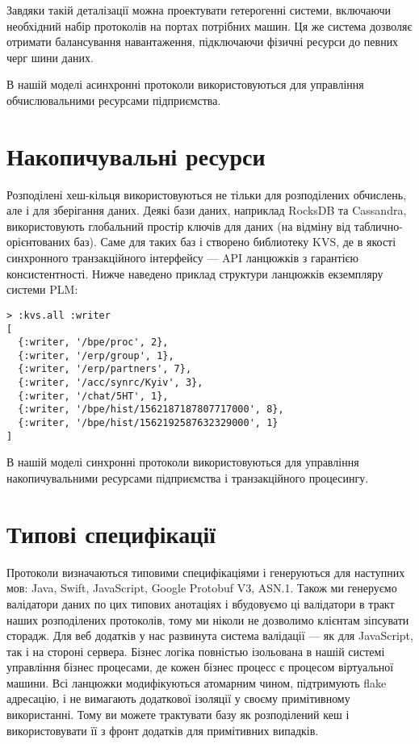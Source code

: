 Завдяки такій деталізації можна проектувати гетерогенні системи,
включаючи необхідний набір протоколів на портах потрібних машин. Ця же система
дозволяє отримати балансування навантаження, підключаючи фізичні ресурси
до певних черг шини даних.

В нашій моделі асинхронні протоколи використовуються для управління
обчислювальними ресурсами підприємства.

\newpage
\section{Накопичувальні ресурси}

Розподілені хеш-кільця використовуються не тільки для розподілених обчислень,
але і для зберігання даних.
Деякі бази даних, наприклад RocksDB та Cassandra, використовують глобальний простір
ключів для даних (на відміну від таблично-орієнтованих баз). Саме для таких
баз і створено библиотеку KVS, де в якості синхронного транзакційного
інтерфейсу — API ланцюжків з гарантією консистентності. Нижче
наведено приклад структури ланцюжків екземпляру системи PLM:

   \begin{lstlisting}
> :kvs.all :writer
[
  {:writer, '/bpe/proc', 2},
  {:writer, '/erp/group', 1},
  {:writer, '/erp/partners', 7},
  {:writer, '/acc/synrc/Kyiv', 3},
  {:writer, '/chat/5HT', 1},
  {:writer, '/bpe/hist/1562187187807717000', 8},
  {:writer, '/bpe/hist/1562192587632329000', 1}
]
\end{lstlisting}

В нашій моделі синхронні протоколи використовуються для управління
накопичувальними ресурсами підприємства і транзакційного процесингу.

\section{Типові специфікації}

Протоколи визначаються типовими специфікаціями і генеруються для наступних мов:
Java, Swift, JavaScript, Google Protobuf V3, ASN.1. Також ми генеруємо валідатори даних по цих
типових анотаціях і вбудовуємо ці валідатори в тракт наших розподілених протоколів,
тому ми ніколи не дозволимо клієнтам зіпсувати сторадж. Для веб додатків у нас развинута
система валідації — як для JavaScript, так і на стороні сервера. Бізнес логіка повністью ізольована в нашій
системі управління бізнес процесами, де кожен бізнес процесс
є процесом віртуальної машини. Всі ланцюжки модифікуються атомарним чином,
підтримують flake адресацію, і не вимагають додаткової ізоляції
у своєму примітивному використанні.
Тому ви можете трактувати базу як розподілений кеш
і використовувати її з фронт додатків для примітивних випадків.

